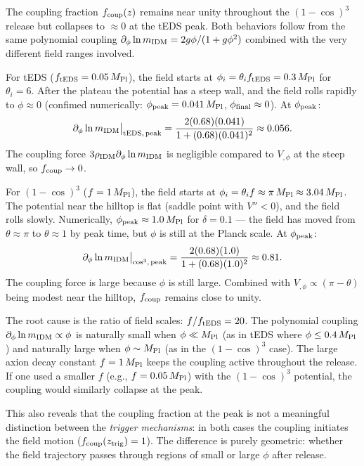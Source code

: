 \documentclass[aps,onecolumn,prd,nofootinbib,superscriptaddress,10pt,longbibliography,floatfix]{revtex4-2}
\newcommand{\mpl}{M_{\rm Pl}}
\newcommand{\dlnm}{\partial_\phi \ln m_{\rm IDM}}
\newcommand{\rIDM}{\rho_{\rm IDM}}
\newcommand{\fcoup}{f_{\rm coup}}
\begin{document}
The coupling fraction $\fcoup(z)$ remains near unity throughout the $(1-\cos)^3$ release but collapses to $\approx 0$ at the tEDS peak. Both behaviors follow from the same polynomial coupling $\dlnm = 2g\phi/(1+g\phi^2)$ combined with the very different field ranges involved.

For tEDS ($f_{\rm tEDS}=0.05\,\mpl$), the field starts at $\phi_i = \theta_i f_{\rm tEDS} = 0.3\,\mpl$ for $\theta_i=6$. After the plateau the potential has a steep wall, and the field rolls rapidly to $\phi\approx 0$ (confimed numerically: $\phi_{\rm peak}=0.041\,\mpl$, $\phi_{\rm final}\approx 0$). At $\phi_{\rm peak}$:
\begin{equation}
\dlnm\big|_{\rm tEDS,\,peak} = \frac{2(0.68)(0.041)}{1+(0.68)(0.041)^2} \approx 0.056.
\end{equation}
The coupling force $3\rIDM\dlnm$ is negligible compared to $V_{,\phi}$ at the steep wall, so $\fcoup\to 0$.

For $(1-\cos)^3$ ($f=1\,\mpl$), the field starts at $\phi_i = \theta_i f \approx \pi\,\mpl \approx 3.04\,\mpl$. The potential near the hilltop is flat (saddle point with $V''<0$), and the field rolls slowly. Numerically, $\phi_{\rm peak}\approx 1.0\,\mpl$ for $\delta=0.1$ — the field has moved from $\theta\approx\pi$ to $\theta\approx 1$ by peak time, but $\phi$ is still at the Planck scale. At $\phi_{\rm peak}$:
\begin{equation}
\dlnm\big|_{\rm cos^3,\,peak} = \frac{2(0.68)(1.0)}{1+(0.68)(1.0)^2} \approx 0.81.
\end{equation}
The coupling force is large because $\phi$ is still large. Combined with $V_{,\phi} \propto (\pi - \theta)$ being modest near the hilltop, $\fcoup$ remains close to unity.

The root cause is the ratio of field scales: $f/f_{\rm tEDS} = 20$. The polynomial coupling $\dlnm \propto \phi$ is naturally small when $\phi \ll \mpl$ (as in tEDS where $\phi \leq 0.4\,\mpl$) and naturally large when $\phi \sim \mpl$ (as in the $(1-\cos)^3$ case). The large axion decay constant $f=1\,\mpl$ keeps the coupling active throughout the release. If one used a smaller $f$ (e.g., $f=0.05\,\mpl$) with the $(1-\cos)^3$ potential, the coupling would similarly collapse at the peak.

This also reveals that the coupling fraction at the peak is not a meaningful distinction between the \emph{trigger mechanisms}: in both cases the coupling initiates the field motion ($\fcoup(z_{\rm trig})=1$). The difference is purely geometric: whether the field trajectory passes through regions of small or large $\phi$ after release.
\end{document}
